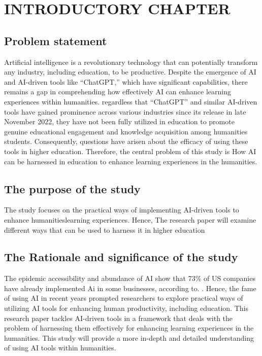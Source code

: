 \chapter{INTRODUCTORY CHAPTER}\label{ch:introductory-chapter}


\section{Problem statement}\label{sec:problem-statement}
\justifying
Artificial intelligence is a revolutionary technology that can potentially transform any industry, including education, to be productive. Despite the emergence of AI and AI-driven tools like “ChatGPT,” which have significant capabilities, there remains a gap in comprehending how effectively AI can enhance learning experiences within humanities. regardless that “ChatGPT” and similar AI-driven tools have gained prominence across various industries since its release in late November 2022, they have not been fully utilized in education to promote genuine educational engagement and knowledge acquisition among humanities students. Consequently, questions have arisen about the efficacy of using these tools in higher education. Therefore, the central problem of this study is How AI can be harnessed in education to enhance learning experiences in the humanities.


\section{The purpose of the study}\label{sec:the-purpose-of-the-study}
\justifying
The study focuses on the practical ways of implementing AI-driven tools to enhance humanitieslearning experiences. Hence, The research paper will examine different ways that can be used to harness it in higher education


\section{The Rationale and significance of the study}\label{sec:the-rationale-and-significance-of-the-study}
\justifying
The epidemic accessibility and abundance of AI show that 73\% of US companies have already
implemented Ai in some businesses, according to\textcite{pricewaterhousecoopers}.
. Hence, the fame of using AI in recent years prompted researchers to explore practical ways of utilizing AI tools for enhancing human productivity, including education. This research paper tackles AI-driven tools in a framework that deals with the problem of harnessing them effectively for enhancing learning experiences in the humanities. This study will provide a more in-depth and detailed understanding of using AI tools within humanities.


